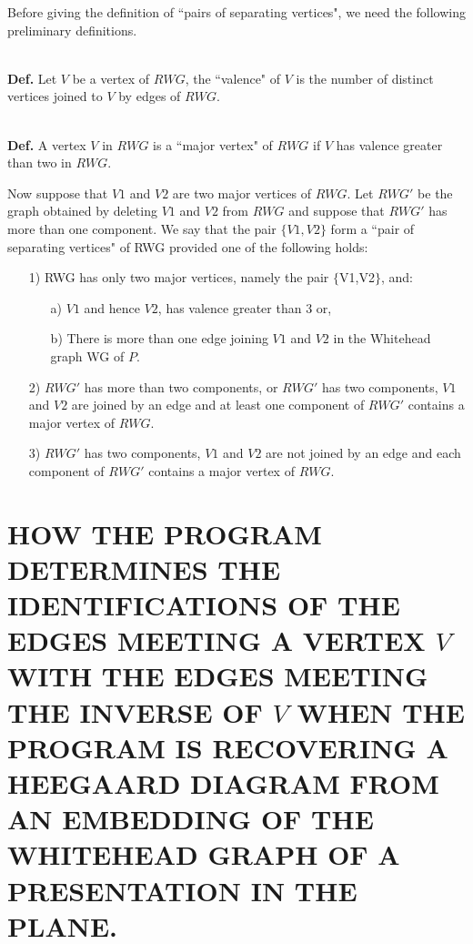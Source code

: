 \documentclass[12pt]{amsart}
\newcommand{\definition}{\ \\ \noindent \textbf{Def.} }
\begin{document}
                Before giving the definition of  ``pairs of separating vertices", we need the following
        preliminary definitions.
        
        \definition     Let $V$ be a vertex of $RWG$, the  ``valence" of $V$ is the number of distinct vertices
                joined to $V$ by edges of $RWG$.
                
        \definition     A vertex $V$ in $RWG$ is a  ``major vertex" of $RWG$ if $V$ has valence greater than two
                in $RWG$. 
        
                Now suppose that $V1$ and $V2$ are two major vertices of $RWG$. Let $RWG'$ be the graph
        obtained by deleting $V1$ and $V2$ from $RWG$ and suppose that $RWG'$ has more than one
        component. We say that the pair $\{ V1,V2\}$ form a  ``pair of separating vertices" of RWG
        provided one of the following holds:
                \begin{enumerate}
                \item[1)]      RWG has only two major vertices, namely the pair $\{ $V1,V2$\}$, and:
                  \begin{enumerate}
                        \item[ a)]      $V1$ and hence $V2$, has valence greater than 3 or,
                        \item[b)]      There is more than one edge joining $V1$ and $V2$ in the Whitehead graph
                                WG of $P$.
                              \end{enumerate}
                 \item[2)]      $RWG'$ has more than two components, or $RWG'$ has two components, $V1$ and $V2$ are
                        joined by an edge and at least one component of $RWG'$ contains a major vertex
                        of $RWG$.
                        
                \item[3)]     $RWG'$ has two components, $V1$ and $V2$ are not joined by an edge and each component
                        of $RWG'$ contains a major vertex of $RWG$.
                        \end{enumerate}

\section{HOW THE PROGRAM DETERMINES THE IDENTIFICATIONS OF THE EDGES MEETING A VERTEX $V$ WITH THE EDGES MEETING THE INVERSE OF $V$ WHEN THE PROGRAM IS RECOVERING A HEEGAARD DIAGRAM FROM AN EMBEDDING OF THE WHITEHEAD GRAPH OF A PRESENTATION IN THE PLANE.}
\end{document}
